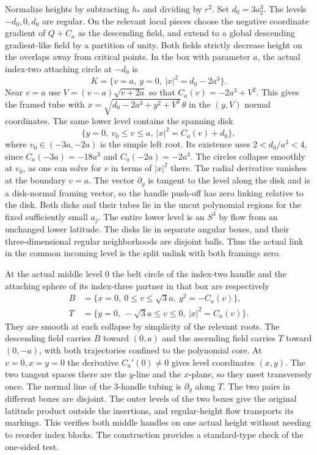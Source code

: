 \documentclass[11pt,letterpaper]{article}
\numberwithin{equation}{section}
\begin{document}
Normalize heights by subtracting \(h_*\) and dividing by \(r^2\).
Set \(d_0=3a_2^3\). The levels \(-d_0,0,d_0\) are regular.
On the relevant local pieces choose the negative coordinate
gradient of \(Q+C_a\) as the descending field, and extend to a
global descending gradient-like field by a partition of unity.
Both fields strictly decrease height on the overlaps away from
critical points. In the box with parameter \(a\), the actual
index-two attaching circle at \(-d_0\) is
\[
 K=\{v=a,\ y=0,\ |x|^2=d_0-2a^3\}.
\]
Near \(v=a\) use \(V=(v-a)\sqrt{v+2a}\) so that
\(C_a(v)=-2a^3+V^2\). This gives the framed tube with
\(x=\sqrt{d_0-2a^3+y^2+V^2}\,\theta\) in the \((y,V)\)
normal coordinates. The same lower level contains the spanning
disk
\[
 \{y=0,\ v_0\le v\le a,\ |x|^2=C_a(v)+d_0\},
\]
where \(v_0\in(-3a,-2a)\) is the simple left root. Its existence
uses \(2<d_0/a^3<4\), since \(C_a(-3a)=-18a^3\) and
\(C_a(-2a)=-2a^3\). The circles collapse smoothly at \(v_0\),
as one can solve for \(v\) in terms of \(|x|^2\) there. The
radial derivative vanishes at the boundary \(v=a\). The vector
\(\partial_y\) is tangent to the level along the disk and is a
disk-normal framing vector, so the handle push-off has zero
linking relative to the disk. Both disks and their tubes lie
in the uncut polynomial regions for the fixed sufficiently
small \(a_j\). The entire lower level is an \(S^3\) by flow from
an unchanged lower latitude. The disks lie in separate angular
boxes, and their three-dimensional regular neighborhoods are
disjoint balls. Thus the actual link in the common incoming
level is the split unlink with both framings zero.

At the actual middle level \(0\) the belt circle of the
index-two handle and the attaching sphere of its index-three
partner in that box are respectively
\[
 \begin{split}
 B&=\{x=0,\ 0\le v\le\sqrt3 a,\ y^2=-C_a(v)\},\\
 T&=\{y=0,\ -\sqrt3 a\le v\le0,\ |x|^2=C_a(v)\}.
 \end{split}
\]
They are smooth at each collapse by simplicity of the relevant
roots. The descending field carries \(B\) toward \((0,a)\) and
the ascending field carries \(T\) toward \((0,-a)\), with both
trajectories confined to the polynomial core. At \(v=0,x=y=0\)
the derivative \(C_a'(0)\ne0\) gives level coordinates \((x,y)\).
The two tangent spaces there are the \(y\)-line and the
\(x\)-plane, so they meet transversely once. The normal line
of the \(3\)-handle tubing is \(\partial_y\) along \(T\).
The two pairs in different boxes are disjoint. The outer levels
of the two boxes give the original latitude product outside
the insertions, and regular-height flow transports its markings.
This verifies both middle handles on one actual height without
needing to reorder index blocks. The construction provides a
standard-type check of the one-sided test.
\end{document}
